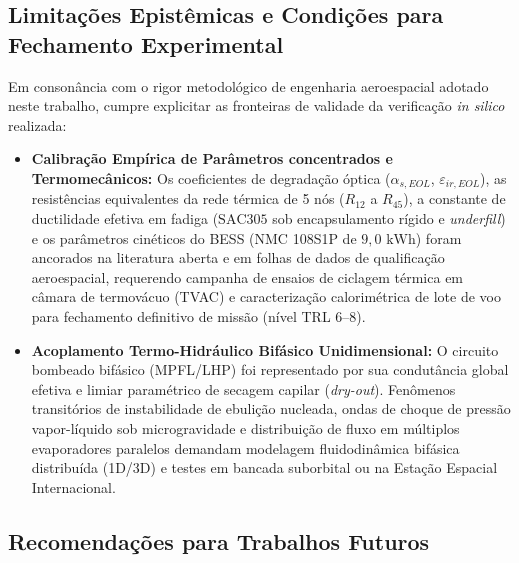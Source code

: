 \subsection{Limitações Epistêmicas e Condições para Fechamento Experimental}
\label{sec:limitacoes_epistemicas_cap5}

Em consonância com o rigor metodológico de engenharia aeroespacial adotado neste trabalho, cumpre explicitar as fronteiras de validade da verificação \textit{in silico} realizada:
\begin{itemize}[leftmargin=*]
    \item \textbf{Calibração Empírica de Parâmetros concentrados e Termomecânicos:} Os coeficientes de degradação óptica ($\alpha_{s,EOL}$, $\varepsilon_{ir,EOL}$), as resistências equivalentes da rede térmica de 5 nós ($R_{12}$ a $R_{45}$), a constante de ductilidade efetiva em fadiga ($\text{SAC305}$ sob encapsulamento rígido e \textit{underfill}) e os parâmetros cinéticos do BESS (NMC 108S1P de $9{,}0\text{ kWh}$) foram ancorados na literatura aberta e em folhas de dados de qualificação aeroespacial, requerendo campanha de ensaios de ciclagem térmica em câmara de termovácuo (TVAC) e caracterização calorimétrica de lote de voo para fechamento definitivo de missão (nível TRL 6--8).
    \item \textbf{Acoplamento Termo-Hidráulico Bifásico Unidimensional:} O circuito bombeado bifásico (MPFL/LHP) foi representado por sua condutância global efetiva e limiar paramétrico de secagem capilar (\textit{dry-out}). Fenômenos transitórios de instabilidade de ebulição nucleada, ondas de choque de pressão vapor-líquido sob microgravidade e distribuição de fluxo em múltiplos evaporadores paralelos demandam modelagem fluidodinâmica bifásica distribuída (1D/3D) e testes em bancada suborbital ou na Estação Espacial Internacional.
\end{itemize}

\subsection{Recomendações para Trabalhos Futuros}
\label{sec:trabalhos_futuros_cap5}

